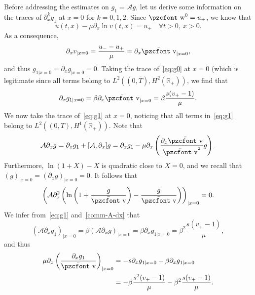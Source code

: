 \documentclass[10pt]{amsart}
\theoremstyle{definition}\newtheorem{defi}[theo]{Definition}\newtheorem{rema}[theo]{Remark}\newtheorem{exam}[theo]{Example}\newtheorem{exem}[theo]{Example}\newtheorem{nota}[theo]{Notation}
\newcommand{\mathpzc}[1]{\text{\pzcfont #1}}
\newcommand{\R}{\mathbb{R}}
\newcommand{\p}{\partial}
\newcommand{\bv}{\bar{\mathpzc{v}}}
\newcommand{\cA}{\mathcal A}
\newcommand{\tw}{\mathpzc{w}}
\let\oldforall\forall
\renewcommand*{\forall}{\mathrel{\oldforall}}
\begin{document}
Before addressing the estimates on $g_1=\cA g$, let us derive some information on the traces of $\p_x^k g_1$ at $x=0$ for $k=0,1, 2$. Since $\tw^0=u_+$, we know that
\[
u(t,x)- \mu \p_x \ln v(t,x)=u_+\quad \forall t>0, \ x>0.
\]
As a consequence,
\[
\p_x v_{|x=0}= \frac{u_--u_+}{\mu}=\p_x \bv_{|x=0},
\]
and thus $g_{1|x=0}=\p_x g_{|x=0}=0$. Taking the trace of~\eqref{eq:g0} at $x=0$ (which is legitimate since all terms belong to $L^2((0, \overline{T}), H^2(\R_+))$, we find that
\begin{equation}\label{trace-dx-g1}
\p_x g_{1|x=0}= \beta \p_x \bv_{|x=0}= \beta \frac{s(v_+-1)}{\mu}.
\end{equation}
We now take the trace of~\eqref{eq:g1} at $x=0$, noticing that all terms in~\eqref{eq:g1} belong to $L^2((0,T), H^1(\R_+))$. Note that
\begin{equation}\label{comm-A-dx}
\cA\p_x g= \p_x g_1 + [\cA, \p_x] g= \p_x g_1 - \mu \p_x \left(\frac{\p_x \bv}{\bv^2} g\right).
\end{equation}
Furthermore, $\ln (1+X)-X$ is quadratic close to $X=0$, and we recall that $(g)_{|x=0} = (\p_x g)_{|x=0}=0$. It follows that
\[
\left(\cA \p_x^2\left(\ln\left(1+ \frac{g}{\bv}\right) - \frac{g}{\bv}\right)\right)_{|x=0}=0.
\]
We infer from~\eqref{eq:g1} and~\eqref{comm-A-dx} that
\[
\left(\cA \p_x g_1\right)_{|x=0} = \beta \left(\cA \partial_x g\right)_{|x=0} = \beta \p_x g_{1|x=0}= \beta^2 \frac{s(v_+-1)}{\mu},
\]
and thus
\begin{align}
\mu \p_x \left(\frac{\p_x g_1}{\bv}\right)_{|x=0} &=- s \p_x g_{1|x=0} - \beta \p_x g_{1|x=0} \label{bc:p2xg1-0}
\\
&=- \beta \frac{s^2(v_+-1)}{\mu} - \beta^2\frac{s(v_+-1)}{\mu}.
\label{eq:px_g1_0}
\end{align}
\end{document}
